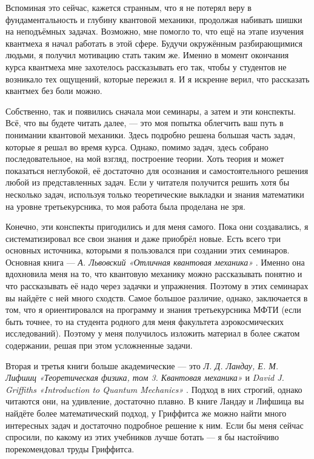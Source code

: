 Вспоминая это сейчас, кажется странным, что я не потерял веру в
фундаментальность и глубину квантовой механики, продолжая набивать шишки на
неподъёмных задачах. Возможно, мне помогло то, что ещё на этапе изучения
квантмеха я начал работать в этой сфере. Будучи окружённым разбирающимися
людьми, я получил мотивацию стать таким же. Именно в момент окончания курса
квантмеха мне захотелось рассказывать его так, чтобы у студентов не возникало
тех ощущений, которые пережил я. И я искренне верил, что рассказать квантмех
без боли можно.

Собственно, так и появились сначала мои семинары, а затем и эти конспекты. Всё,
что вы будете читать далее, --- это моя попытка облегчить ваш путь в понимании
квантовой механики. Здесь подробно решена большая часть задач, которые я решал
во время курса. Однако, помимо задач, здесь собрано последовательное, на мой
взгляд, построение теории. Хоть теория и может показаться неглубокой, её
достаточно для осознания и самостоятельного решения любой из представленных
задач. Если у читателя получится решить хотя бы несколько задач, используя
только теоретические выкладки и знания математики на уровне третьекурсника, то
моя работа была проделана не зря.

Конечно, эти конспекты пригодились и для меня самого. Пока они создавались, я
систематизировал все свои знания и даже приобрёл новые. Есть всего три основных
источника, которыми я пользовался при создании этих семинаров. Основная книга
--- \textit{А. Львовский «Отличная квантовая механика»} \cite{ОКМ}. Именно она
вдохновила меня на то, что квантовую механику можно рассказывать понятно и что
рассказывать её надо через задачки и упражнения. Поэтому в этих семинарах вы
найдёте с ней много сходств. Самое большое различие, однако, заключается в том,
что я ориентировался на программу и знания третьекурсника МФТИ (если быть
точнее, то на студента родного для меня факультета аэрокосмических
исследований). Поэтому у меня получилось изложить материал в более сжатом
содержании, решая при этом усложненные задачи.

Вторая и третья книги больше академические --- это \textit{Л. Д. Ландау, Е. М.
  Лифшиц «Теоретическая физика, том 3. Квантовая механика»} \cite{ЛЛ} и
\textit{David J. Griffiths «Introduction to Quantum Mechanics»} \cite{IQM}.
Подход в них строгий, однако читаются они, на удивление, достаточно плавно. В
книге Ландау и Лифшица вы найдёте более математический подход, у Гриффитса же
можно найти много интересных задач и достаточно подробное решение к ним. Если
бы меня сейчас спросили, по какому из этих учебников лучше ботать --- я бы
настойчиво порекомендовал труды Гриффитса.

